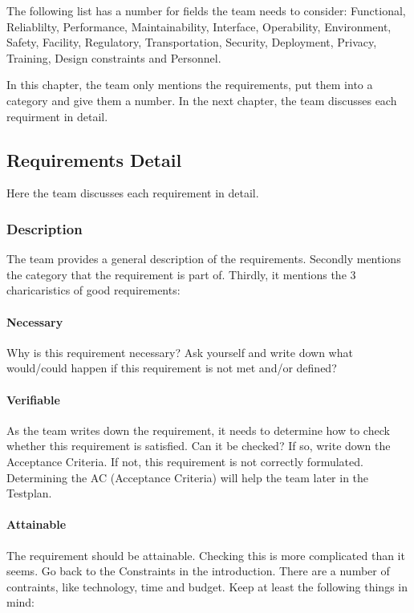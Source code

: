 \documentclass[10pt]{report}
\begin{document}
The following list has a number for fields the team needs to consider: Functional, Reliablilty, Performance, Maintainability, Interface, Operability, Environment, Safety, Facility, Regulatory, Transportation, Security, Deployment, Privacy, Training, Design constraints and Personnel.

In this chapter, the team only mentions the requirements, put them into a category and give them a number. In the next chapter, the team discusses each requirment in detail.

\subsection{Requirements Detail}

Here the team discusses each requirement in detail. 

\subsubsection{Description}

The team provides a general description of the requirements. Secondly mentions the category that the requirement is part of. Thirdly, it mentions the 3 charicaristics of good requirements:

\paragraph{Necessary}

Why is this requirement necessary? Ask yourself and write down what would/could happen if this requirement is not met and/or defined?

\paragraph{Verifiable}

As the team writes down the requirement, it needs to determine how to check whether this requirement is satisfied. Can it be checked? If so, write down the Acceptance Criteria. If not, this requirement is not correctly formulated. Determining the AC (Acceptance Criteria) will help the team later in the Testplan.

\paragraph{Attainable}

The requirement should be attainable. Checking this is more complicated than it seems. Go back to the Constraints in the introduction. There are a number of contraints, like technology, time and budget. Keep at least the following things in mind:
\end{document}
